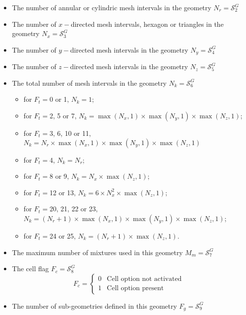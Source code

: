 \begin{itemize}
\item The number of annular or cylindric mesh intervals in the geometry $N_{r}=\mathcal{S}^{G}_{2}$

\item The number of $x-$directed mesh intervals, hexagon or triangles in the geometry $N_{x}=\mathcal{S}^{G}_{3}$

\item The number of $y-$directed mesh intervals in the geometry $N_{y}=\mathcal{S}^{G}_{4}$

\item The number of $z-$directed mesh intervals in the geometry $N_{z}=\mathcal{S}^{G}_{5}$

\item The total number of mesh intervals in the geometry $N_{k}=\mathcal{S}^{G}_{6}$
\begin{itemize}
\item for $F_{t}=$0 or 1, $N_{k}=1$;
\item for $F_{t}=$2, 5 or 7, $N_{k}=\max(N_{x},1)\times \max(N_{y},1)\times \max(N_{z},1)$;
\item for $F_{t}=$3, 6, 10 or 11, $N_{k}=N_{r}\times \max(N_{x},1)\times \max(N_{y},1)\times \max(N_{z},1)$
\item for $F_{t}=$4, $N_{k}=N_{r}$;
\item for $F_{t}=$8 or 9, $N_{k}=N_{x}\times \max(N_{z},1)$;
\item for $F_{t}=$12 or 13, $N_{k} = 6\times N_{x}^{2}\times \max(N_{z},1)$;
\item for $F_{t}=$20, 21, 22 or 23, $N_{k} = (N_{r}+1)\times \max(N_{x},1)\times \max(N_{y},1)\times \max(N_{z},1)$;
\item for $F_{t}=$24 or 25, $N_{k} = (N_{r}+1)\times \max(N_{z},1)$.
\end{itemize}

\item The maximum number of mixtures used in this geometry $M_{m}=\mathcal{S}^{G}_{7}$

\item The cell flag $F_{c}=\mathcal{S}^{G}_{8}$ 
\begin{displaymath}
F_{c} = \left\{
\begin{array}{rl}
 0 & \textrm{Cell option not activated} \\
 1 & \textrm{Cell option present} 
\end{array} \right.
\end{displaymath}

\item The number of sub-geometries defined in this geometry $F_{g}=\mathcal{S}^{G}_{9}$ 


\end{itemize}
